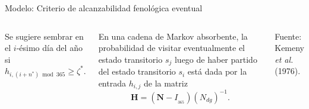 \documentclass[aspectratio=169]{beamer}
\begin{document}
\begin{frame}{Modelo: Criterio de alcanzabilidad fenológica eventual}
	\vspace{-1cm}\begin{columns}
		
		\begin{block}{}
			Se sugiere sembrar en el $i$-ésimo día del año si $$h_{i,(i+n^*)\bmod{365}} \geq \zeta^*.$$
		\end{block}
		
		En una cadena de Markov absorbente, la probabilidad de visitar eventualmente el estado transitorio $s_j$ luego de haber partido del estado transitorio $s_i$ está dada por la entrada $h_{i,j}$ de la matriz $$\mathbf{H}= (\mathbf{N} - I_{_{365}})(N_{dg})^{-1}.$$
		
		{\scriptsize Fuente: Kemeny \textit{et al.} (1976).}
	\end{columns}
\end{frame}

\fi
\end{document}
